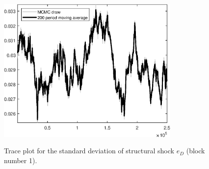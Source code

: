 \begin{figure}[H]
\centering
  \includegraphics[width=0.8\textwidth]{BRS_growth_ext_util/graphs/TracePlot_SE_e_D_blck_1}\\
    \caption{Trace plot for the standard deviation of structural shock ${e_D}$ (block number 1).}
\end{figure}
